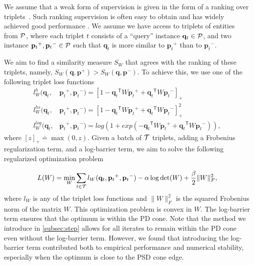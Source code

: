\documentclass[twoside,11pt]{article}
\newcommand\mat[1]{{#1}}
\renewcommand\vec[1]{\mathbf{#1}}
\newcommand{\T}{{}^\mathsf{T}}
\newcommand{\W}{\mat{W}}
\newcommand{\eqdef}{\doteq}
\newcommand{\frobsq}[1]{{\|#1\|_F^2}}
\newcommand{\ignore}[1]{}
\newcommand{\q}{{\vec{q}}}
\newcommand{\p}{{\vec{p}}}
\newcommand{\trip}{{t}}
\newcommand{\qt}{{\q_{\trip}}}
\newcommand{\pt}{{\p_{\trip}}}
\begin{document}
We assume that a weak form of supervision is given in the form of a ranking over triplets~\citep{weinberger2006dml,OASIS,qian}. Such ranking supervision is often easy to obtain and has widely achieved good performance . We assume we have access to triplets of entities from $\cal{P}$, where each triplet $t$ consists of
a ``query'' instance $\qt \in \cal{P}$, and two instance $\pt^{+}, \pt^{-} \in \cal{P}$ such that $\qt$ is more similar to $\pt^{+}$
than to $\pt^{-}$.

We aim to find a similarity measure $S_{\W}$ that agrees with the ranking of these triplets, namely, $S_{\W}(\q, \p^{+}) > S_{\W}(\q,
\p^{-})$. To achieve this, we use one of the following triplet loss functions
\begin{align}
\label{single-triplet-lossed}
l_{\W}^h(\qt, &\pt^{+}, \pt^{-}) = [1-\qt\T\W\pt^+ + \qt\T\W\pt^-]_{+}
 \\ \nonumber
l_{\W}^{hs}(\qt, &\pt^+, \pt^-) = [1-\qt\T\W\pt^+ + \qt\T\W\pt^-]_{+}^2
 \\ \nonumber
l_{\W}^{log}(\qt, &\pt^+, \pt^-) = log(1+exp(-\qt\T\W\pt^+ + \qt\T\W\pt^-)) \nonumber ,
\end{align}
where $[z]_{+} \eqdef \max(0,z)$. Given a batch of $\cal{T}$ triplets, adding a Frobenius regularization term, and a log-barrier term, we aim to solve the following regularized optimization problem

\begin{equation}
\label{eq-logdet-loss}
L(W) = 
  \min_{\W} \sum_{\trip \in \cal{T}}  l_{\W}(\qt, \pt^+, \pt^-) - \alpha \log \det(\W) + \frac{\beta}{2} \frobsq{\W},
\end{equation}
where $l_{\W}$ is any of the triplet loss functions and $\frobsq{\W}$ is the squared Frobenius norm of the matrix $\W$. This optimization problem is convex in $\W$.
The log-barrier term ensures that the optimum is within the PD cone. Note that the method we introduce in \ref{subsec:step} allows for all iterates to remain within the PD cone even without the log-barrier term. However, we found that introducing the log-barrier term contributed both to empirical performance and numerical stability, especially when the optimum is close to the PSD cone edge.


\ignore{
\begin{eqnarray}
  \min_{\W}& \sum_{\trip=1}^{\cal{T}}  l_{\W}(\qt, \pt^+, \pt^-) + \frac{\beta}{2} \frobsq{\W}
 \\  \nonumber
   \rm{s.t.}& \W \succ 0 \quad,
\label{hingelt}
\end{eqnarray}
}
\end{document}
